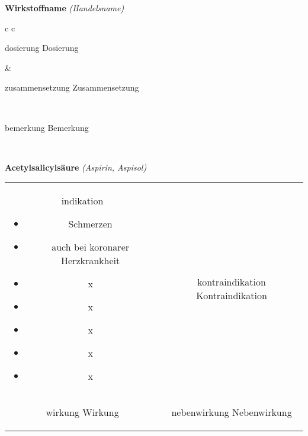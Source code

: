 \documentclass[12pt]{beamer}
\begin{document}
\begin{frame}{
    \textbf{Wirkstoffname}
    \textit{(Handelsname)}
}
    \begin{tabular}{c c}
        \begin{beamercolorbox}[wd=\boxwidth\textwidth,ht=\boxheight\textheight,sep=1em]{dosierung}
        Dosierung
        \end{beamercolorbox} & 
        \begin{beamercolorbox}[wd=\boxwidth\textwidth,ht=\boxheight\textheight,sep=1em]{zusammensetzung}
        Zusammensetzung
        \end{beamercolorbox} \\
        \begin{beamercolorbox}[wd=\textwidth,ht=\boxheight\textheight,sep=1em]{bemerkung}
        Bemerkung
        \end{beamercolorbox} \\
    \end{tabular}
\end{frame}

\begin{frame}{
    \textbf{Acetylsalicylsäure}
    \textit{(Aspirin, Aspisol)}
}
    \begin{tabular}{c c}
        \begin{beamercolorbox}[wd=\boxwidth\textwidth,ht=\boxheight\textheight,sep=1em]{indikation}
        \begin{itemize}
            \item Schmerzen
            \item auch bei koronarer Herzkrankheit
            \item x
            \item x
            \item x
            \item x
            \item x
        \end{itemize}
        \end{beamercolorbox} & 
        \begin{beamercolorbox}[wd=\boxwidth\textwidth,ht=\boxheight\textheight,sep=1em]{kontraindikation}
        Kontraindikation 
        \end{beamercolorbox} \\
        \begin{beamercolorbox}[wd=\boxwidth\textwidth,ht=\boxheight\textheight,sep=1em]{wirkung}
        Wirkung
        \end{beamercolorbox} & 
        \begin{beamercolorbox}[wd=\boxwidth\textwidth,ht=\boxheight\textheight,sep=1em]{nebenwirkung}
        Nebenwirkung
        \end{beamercolorbox} \\
    \end{tabular}
\end{frame}
\end{document}
